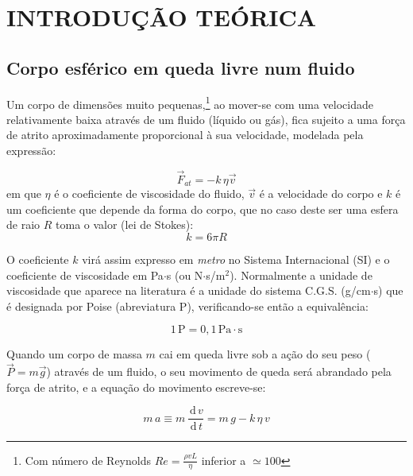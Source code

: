 \documentclass[a4paper,twoside,12pt]{article}      %
\newcommand{\ud}{\,\mathrm{d}}
\begin{document}
\section{\sf INTRODUÇÃO TEÓRICA}
\subsection{\sf Corpo esférico em queda livre num fluido}
Um corpo de dimensões muito pequenas,\footnote{Com número de Reynolds $Re= \frac{\rho v L}{\eta}$ inferior a $\simeq 100$}  ao mover-se com uma velocidade relativamente baixa através de um fluido (líquido ou gás), fica sujeito a uma força de atrito aproximadamente proporcional à sua velocidade, modelada pela expressão:

\begin{equation}
	\label{eq:f_atrito}
	\vec{F}_{at} = - k \, \eta \vec{v}
\end{equation}
em que $\eta$ é o coeficiente de viscosidade do fluido, $\vec{v}$ é a velocidade do corpo e $k$ é um coeficiente que depende da forma do corpo, que no caso deste ser uma esfera de raio $R$ toma o valor (lei de Stokes): 
\begin{equation}
	\label{eq:coef_atrito}
	k = 6 \pi R
\end{equation}


O coeficiente $k$ virá assim expresso em \emph{metro} no Sistema Internacional (SI) e o coeficiente de viscosidade em Pa$\cdot$s (ou N$\cdot$s/m$^2$).
Normalmente a unidade de viscosidade que aparece na literatura é a unidade do sistema C.G.S. (g/cm$\cdot$s) que é designada por Poise (abreviatura P), verificando-se então a equivalência:

\begin{equation*}
	1 \, \mathrm{P} = 0,1\, \mathrm{Pa}\cdot\mathrm{s}
\end{equation*}

Quando um corpo de massa $m$ cai em queda livre sob a ação do seu peso ($\vec{P}=m\vec{g}$) através de um fluido, o seu movimento de queda será abrandado pela força de atrito, e a equação do movimento escreve-se:

\begin{equation}
	\label{eq:mov}
	m\,a \equiv m\, \frac{\ud\, v}{\ud\, t} =  m\,g - k  \, \eta \, v
\end{equation}
\end{document}
